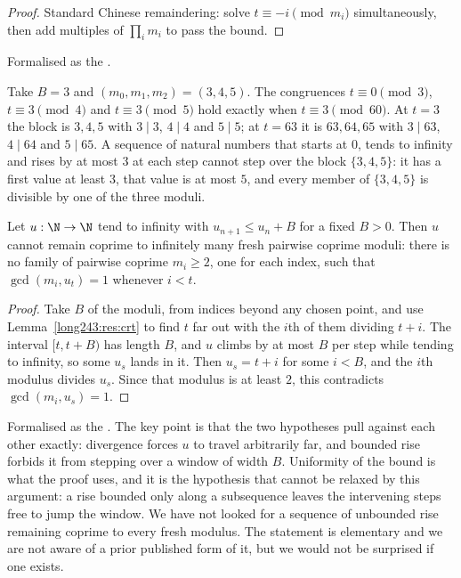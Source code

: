 \documentclass[11pt]{article}
\begin{document}
\begin{proof}
Standard Chinese remaindering: solve $t\equiv-i \pmod{m_i}$ simultaneously,
then add multiples of $\prod_i m_i$ to pass the bound.
\end{proof}

\noindent Formalised as the
.

\begin{example}\label{long243:ex:crt}
Take $B=3$ and $(m_0,m_1,m_2)=(3,4,5)$.  The congruences $t\equiv0\pmod3$,
$t\equiv3\pmod4$ and $t\equiv3\pmod5$ hold exactly when $t\equiv3\pmod{60}$.
At $t=3$ the block is $3,4,5$ with $3\mid3$, $4\mid4$ and $5\mid5$; at $t=63$
it is $63,64,65$ with $3\mid63$, $4\mid64$ and $5\mid65$.  A sequence of
natural numbers that starts at $0$, tends to infinity and rises by at most $3$
at each step cannot step over the block $\{3,4,5\}$: it has a first value at
least $3$, that value is at most $5$, and every member of $\{3,4,5\}$ is
divisible by one of the three moduli.
\end{example}

\begin{theorem}\label{long243:res:barrier}
Let $u:\N\to\N$ tend to infinity with $u_{n+1}\le u_n+B$ for a fixed $B>0$.
Then $u$ cannot remain coprime to infinitely many fresh pairwise coprime
moduli: there is no family of pairwise coprime $m_i\ge2$, one for each index,
such that $\gcd(m_i,u_t)=1$ whenever $i<t$.
\end{theorem}

\begin{proof}
Take $B$ of the moduli, from indices beyond any chosen point, and use
Lemma~\ref{long243:res:crt} to find $t$ far out with the $i$th of them dividing $t+i$.
The interval $[t,t+B)$ has length $B$, and $u$ climbs by at most $B$ per step
while tending to infinity, so some $u_s$ lands in it.  Then $u_s=t+i$ for some
$i<B$, and the $i$th modulus divides $u_s$.  Since that modulus is at least
$2$, this contradicts $\gcd(m_i,u_s)=1$.
\end{proof}

\noindent Formalised as the
.  The key point is that the two hypotheses pull against each other
exactly: divergence forces $u$ to travel arbitrarily far, and bounded rise
forbids it from stepping over a window of width $B$.  Uniformity of the bound
is what the proof uses, and it is the hypothesis that cannot be relaxed by this
argument: a rise bounded only along a subsequence leaves the intervening steps
free to jump the window.  We have not looked for a sequence of unbounded rise
remaining coprime to every fresh modulus.  The statement is elementary and we are not aware of a
prior published form of it, but we would not be surprised if one exists.
\end{document}
